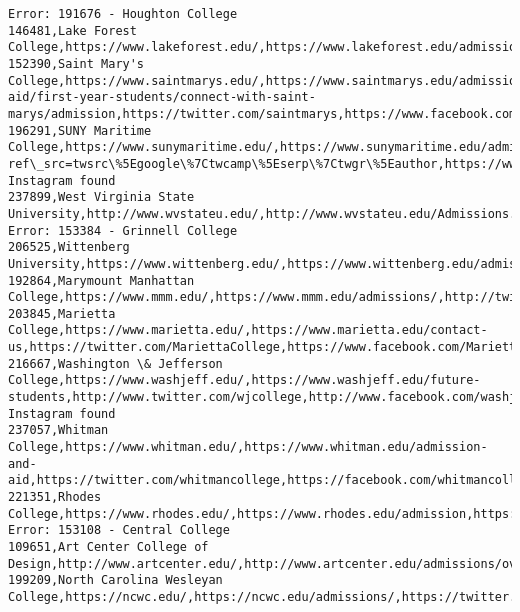 \documentclass[11pt]{article}
\begin{document}
\begin{Verbatim}[commandchars=\\\{\}]
Error: 191676 - Houghton College
146481,Lake Forest College,https://www.lakeforest.edu/,https://www.lakeforest.edu/admissions/,https://twitter.com/lfcollege,https://www.facebook.com/lakeforestcollege,https://instagram.com/lakeforestcollege/
152390,Saint Mary's College,https://www.saintmarys.edu/,https://www.saintmarys.edu/admission-aid/first-year-students/connect-with-saint-marys/admission,https://twitter.com/saintmarys,https://www.facebook.com/saintmaryscollege,https://instagram.com/saintmaryscollege/
196291,SUNY Maritime College,https://www.sunymaritime.edu/,https://www.sunymaritime.edu/admissions,https://twitter.com/MaritimeCollege?ref\_src=twsrc\%5Egoogle\%7Ctwcamp\%5Eserp\%7Ctwgr\%5Eauthor,https://www.facebook.com/sunymaritimecollege/,No Instagram found
237899,West Virginia State University,http://www.wvstateu.edu/,http://www.wvstateu.edu/Admissions.aspx,https://twitter.com/WVStateU,https://www.facebook.com/wvstateu,https://www.instagram.com/wvstateu/
Error: 153384 - Grinnell College
206525,Wittenberg University,https://www.wittenberg.edu/,https://www.wittenberg.edu/admission,https://twitter.com/wittenberg,https://www.facebook.com/wittenberguniversity,https://www.instagram.com/wittenberguniversity/
192864,Marymount Manhattan College,https://www.mmm.edu/,https://www.mmm.edu/admissions/,http://twitter.com/NYCMarymount,http://www.facebook.com/MarymountManhattan,http://instagram.com/nycmarymount
203845,Marietta College,https://www.marietta.edu/,https://www.marietta.edu/contact-us,https://twitter.com/MariettaCollege,https://www.facebook.com/MariettaCollege,https://www.instagram.com/mariettacollege
216667,Washington \& Jefferson College,https://www.washjeff.edu/,https://www.washjeff.edu/future-students,http://www.twitter.com/wjcollege,http://www.facebook.com/washjeff,No Instagram found
237057,Whitman College,https://www.whitman.edu/,https://www.whitman.edu/admission-and-aid,https://twitter.com/whitmancollege,https://facebook.com/whitmancollege,https://instagram.com/whitmancollege
221351,Rhodes College,https://www.rhodes.edu/,https://www.rhodes.edu/admission,https://twitter.com/RhodesCollege,https://www.facebook.com/rhodescollege,https://instagram.com/rhodescollege/
Error: 153108 - Central College
109651,Art Center College of Design,http://www.artcenter.edu/,http://www.artcenter.edu/admissions/overview.html,https://twitter.com/artcenteredu,https://www.facebook.com/artcenteredu/,https://www.instagram.com/artcenteredu/
199209,North Carolina Wesleyan College,https://ncwc.edu/,https://ncwc.edu/admissions/,https://twitter.com/ncwesleyan,https://www.facebook.com/NorthCarolinaWesleyanCollege,https://www.instagram.com/ncwesleyan

\end{Verbatim}
\end{document}
